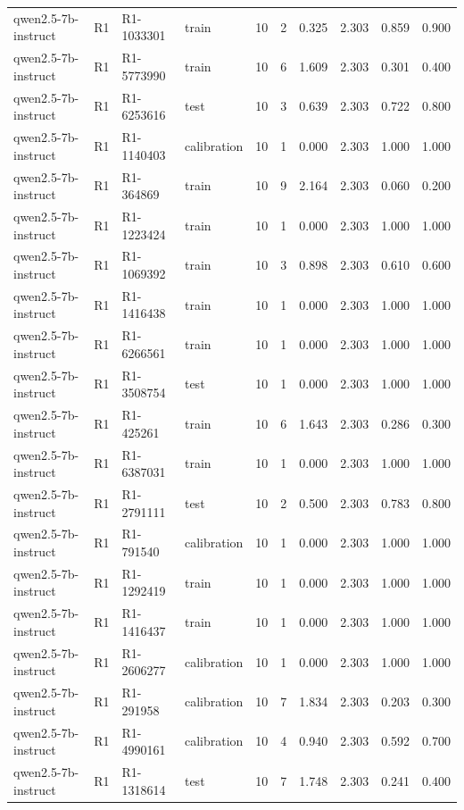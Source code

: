 \begin{table}
\begin{tabular}{llllrrrrrr}
qwen2.5-7b-instruct & R1 & R1-1033301 & train & 10 & 2 & 0.325 & 2.303 & 0.859 & 0.900 \\
qwen2.5-7b-instruct & R1 & R1-5773990 & train & 10 & 6 & 1.609 & 2.303 & 0.301 & 0.400 \\
qwen2.5-7b-instruct & R1 & R1-6253616 & test & 10 & 3 & 0.639 & 2.303 & 0.722 & 0.800 \\
qwen2.5-7b-instruct & R1 & R1-1140403 & calibration & 10 & 1 & 0.000 & 2.303 & 1.000 & 1.000 \\
qwen2.5-7b-instruct & R1 & R1-364869 & train & 10 & 9 & 2.164 & 2.303 & 0.060 & 0.200 \\
qwen2.5-7b-instruct & R1 & R1-1223424 & train & 10 & 1 & 0.000 & 2.303 & 1.000 & 1.000 \\
qwen2.5-7b-instruct & R1 & R1-1069392 & train & 10 & 3 & 0.898 & 2.303 & 0.610 & 0.600 \\
qwen2.5-7b-instruct & R1 & R1-1416438 & train & 10 & 1 & 0.000 & 2.303 & 1.000 & 1.000 \\
qwen2.5-7b-instruct & R1 & R1-6266561 & train & 10 & 1 & 0.000 & 2.303 & 1.000 & 1.000 \\
qwen2.5-7b-instruct & R1 & R1-3508754 & test & 10 & 1 & 0.000 & 2.303 & 1.000 & 1.000 \\
qwen2.5-7b-instruct & R1 & R1-425261 & train & 10 & 6 & 1.643 & 2.303 & 0.286 & 0.300 \\
qwen2.5-7b-instruct & R1 & R1-6387031 & train & 10 & 1 & 0.000 & 2.303 & 1.000 & 1.000 \\
qwen2.5-7b-instruct & R1 & R1-2791111 & test & 10 & 2 & 0.500 & 2.303 & 0.783 & 0.800 \\
qwen2.5-7b-instruct & R1 & R1-791540 & calibration & 10 & 1 & 0.000 & 2.303 & 1.000 & 1.000 \\
qwen2.5-7b-instruct & R1 & R1-1292419 & train & 10 & 1 & 0.000 & 2.303 & 1.000 & 1.000 \\
qwen2.5-7b-instruct & R1 & R1-1416437 & train & 10 & 1 & 0.000 & 2.303 & 1.000 & 1.000 \\
qwen2.5-7b-instruct & R1 & R1-2606277 & calibration & 10 & 1 & 0.000 & 2.303 & 1.000 & 1.000 \\
qwen2.5-7b-instruct & R1 & R1-291958 & calibration & 10 & 7 & 1.834 & 2.303 & 0.203 & 0.300 \\
qwen2.5-7b-instruct & R1 & R1-4990161 & calibration & 10 & 4 & 0.940 & 2.303 & 0.592 & 0.700 \\
qwen2.5-7b-instruct & R1 & R1-1318614 & test & 10 & 7 & 1.748 & 2.303 & 0.241 & 0.400 \\

\end{tabular}
\end{table}
